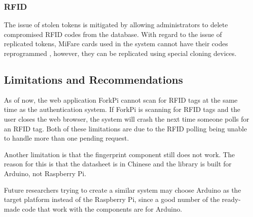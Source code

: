 \subsubsection{RFID}
The issue of stolen tokens is mitigated by allowing administrators to delete compromised RFID codes from the database. With regard to the issue of replicated tokens, MiFare cards used in the system cannot have their codes reprogrammed \cite{MiFareAdafruit}, however, they can be replicated using special cloning devices\cite{Yung2013}.

\subsection{Limitations and Recommendations}
As of now, the web application ForkPi cannot scan for RFID tags at the same time as the authentication system. If ForkPi is scanning for RFID tags and the user closes the web browser, the system will crash the next time someone polls for an RFID tag. Both of these limitations are due to the RFID polling being unable to handle more than one pending request.

Another limitation is that the fingerprint component still does not work. The reason for this is that the datasheet is in Chinese and the library is built for Arduino, not Raspberry Pi.

Future researchers trying to create a similar system may choose Arduino as the target platform instead of the Raspberry Pi, since a good number of the ready-made code that work with the components are for Arduino.